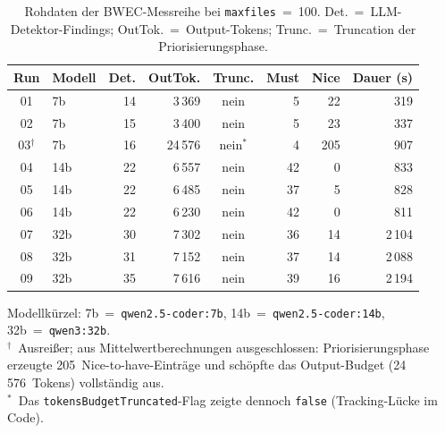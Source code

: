 \begin{table}[htbp]
\centering
\setlength{\tabcolsep}{4pt}
\renewcommand{\arraystretch}{1.2}
\caption[Rohdaten \ac{BWEC} (\texttt{maxfiles}=100)]{Rohdaten der \ac{BWEC}-Messreihe bei \texttt{maxfiles}~=~100. Det.~=~\ac{LLM}-Detektor-Findings; OutTok.~=~Output-Tokens; Trunc.~=~Truncation der Priorisierungsphase.}
\small
\begin{tabular}{|c|l|r|r|c|r|r|r|}
\hline
\textbf{Run} & \textbf{Modell} & \textbf{Det.} & \textbf{OutTok.} & \textbf{Trunc.} & \textbf{Must} & \textbf{Nice} & \textbf{Dauer (s)} \\
\hline
01 & 7b            & 14 &  3\,369 & nein       &  5 &  22 &   319 \\
\hline
02 & 7b            & 15 &  3\,400 & nein       &  5 &  23 &   337 \\
\hline
03$^{\dag}$ & 7b   & 16 & 24\,576 & nein$^{*}$ &  4 & 205 &   907 \\
\hline
04 & 14b           & 22 &  6\,557 & nein       & 42 &   0 &   833 \\
\hline
05 & 14b           & 22 &  6\,485 & nein       & 37 &   5 &   828 \\
\hline
06 & 14b           & 22 &  6\,230 & nein       & 42 &   0 &   811 \\
\hline
07 & 32b           & 30 &  7\,302 & nein       & 36 &  14 & 2\,104 \\
\hline
08 & 32b           & 31 &  7\,152 & nein       & 37 &  14 & 2\,088 \\
\hline
09 & 32b           & 35 &  7\,616 & nein       & 39 &  16 & 2\,194 \\
\hline
\end{tabular}
\label{tab:rohdaten_bwec}
\end{table}

{\footnotesize\noindent
Modellkürzel: 7b~=~\texttt{qwen2.5-coder:7b}, 14b~=~\texttt{qwen2.5-coder:14b}, 32b~=~\texttt{qwen3:32b}.\\
$^{\dag}$~Ausreißer; aus Mittelwertberechnungen ausgeschlossen: Priorisierungsphase erzeugte 205~Nice-to-have-Einträge und schöpfte das Output-Budget (24\,576~Tokens) vollständig aus.\\
$^{*}$~Das \texttt{tokensBudgetTruncated}-Flag zeigte dennoch \texttt{false} (Tracking-Lücke im Code).
}

\clearpage

\label{app:modell_summary_bwec}

